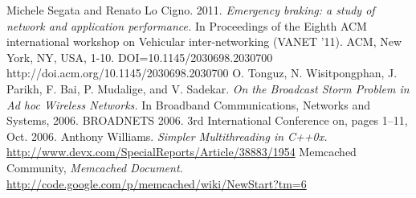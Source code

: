 \documentclass[twocolumn]{article}
\begin{document}
    \begin{thebibliography}{9}
     Michele Segata and Renato Lo Cigno. 2011. {\it Emergency braking: a study of network and application performance.} In Proceedings of the Eighth ACM international workshop on Vehicular inter-networking (VANET '11). ACM, New York, NY, USA, 1-10. DOI=10.1145/2030698.2030700 http://doi.acm.org/10.1145/2030698.2030700
     O. Tonguz, N. Wisitpongphan, J. Parikh, F. Bai, P. Mudalige, and V. Sadekar. {\it On the Broadcast Storm Problem in Ad hoc Wireless Networks.} In Broadband Communications, Networks and Systems, 2006. BROADNETS 2006. 3rd International Conference on, pages 1–11, Oct. 2006.
     Anthony Williams. {\it Simpler Multithreading in C++0x.} \url{http://www.devx.com/SpecialReports/Article/38883/1954}
     Memcached Community, {\it Memcached Document.} \url{http://code.google.com/p/memcached/wiki/NewStart?tm=6}
    \end{thebibliography}
    
\end{document}

